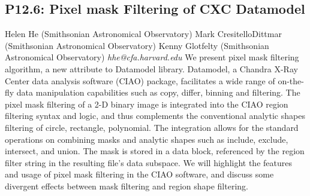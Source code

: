 \documentclass{report}
\begin{document}
\subsection*{P12.6: Pixel mask Filtering of CXC Datamodel}
\bigskip
Helen He (Smithsonian Astronomical Observatory) \newline Mark  CresitelloDittmar (Smithsonian Astronomical Observatory) \newline  Kenny  Glotfelty (Smithsonian Astronomical Observatory)\newline   \newline  \newline  \newline\newline
{\it hhe@cfa.harvard.edu}\newline
\newline\newline
We present pixel mask filtering algorithm, a new attribute to Datamodel library. Datamodel, a Chandra X-Ray Center data analysis software (CIAO) package, facilitates a wide range of on-the-fly data manipulation capabilities such as copy, differ, binning and filtering. The pixel mask filtering of a 2-D binary image is integrated into the CIAO region filtering syntax and logic, and thus complements the 
conventional analytic shapes filtering of circle, rectangle, polynomial. The integration allows for the standard operations on combining masks and analytic shapes such as include, exclude, intersect, and union. The mask is stored in a data block, 
referenced by the region filter string in the resulting file's data subspace.
We will highlight the features and usage of pixel mask filtering in
the CIAO software, and discuss some divergent effects between mask filtering and region shape filtering.\newline
\newpage
\end{document}
